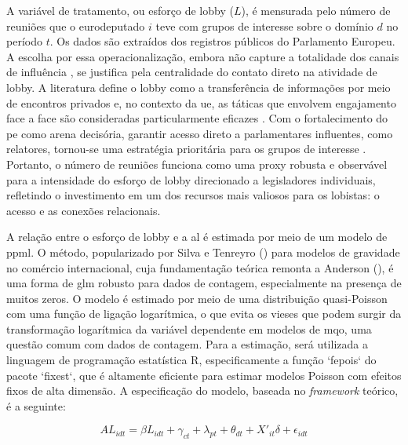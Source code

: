 A variável de tratamento, ou esforço de lobby ($L$), é mensurada pelo número de reuniões que o eurodeputado $i$ teve com grupos de interesse sobre o domínio $d$ no período $t$. Os dados são extraídos dos registros públicos do Parlamento Europeu. A escolha por essa operacionalização, embora não capture a totalidade dos canais de influência \cite{dur_measuring_2008}, se justifica pela centralidade do contato direto na atividade de lobby. A literatura define o lobby como a transferência de informações por meio de encontros privados \cite{de_figueiredo_advancing_2014} e, no contexto da \acrshort{ue}, as táticas que envolvem engajamento face a face são consideradas particularmente eficazes \cite{Huwyler2022}. Com o fortalecimento do \acrshort{pe} como arena decisória, garantir acesso direto a parlamentares influentes, como relatores, tornou-se uma estratégia prioritária para os grupos de interesse \cite{kluver2015legislative, marshall2010lobby}. Portanto, o número de reuniões funciona como uma proxy robusta e observável para a intensidade do esforço de lobby direcionado a legisladores individuais, refletindo o investimento em um dos recursos mais valiosos para os lobistas: o acesso e as conexões relacionais.

A relação entre o esforço de lobby e a \acrshort{al} é estimada por meio de um modelo de \acrfull{ppml}. O método, popularizado por Silva e Tenreyro (\citeyear{silva2006log}) para modelos de gravidade no comércio internacional, cuja fundamentação teórica remonta a Anderson (\citeyear{anderson1979theoretical}), é uma forma de \acrfull{glm} robusto para dados de contagem, especialmente na presença de muitos zeros. O modelo é estimado por meio de uma distribuição quasi-Poisson com uma função de ligação logarítmica, o que evita os vieses que podem surgir da transformação logarítmica da variável dependente em modelos de \acrfull{mqo}, uma questão comum com dados de contagem. Para a estimação, será utilizada a linguagem de programação estatística R, especificamente a função `fepois` do pacote `fixest`, que é altamente eficiente para estimar modelos Poisson com efeitos fixos de alta dimensão. A especificação do modelo, baseada no \textit{framework} teórico, é a seguinte:

\begin{equation}
    \label{eq:modelo_final}
    AL_{idt} = \beta L_{idt} + \gamma_{ct} + \lambda_{pt} + \theta_{dt} + X'_{it}\delta + \epsilon_{idt}
\end{equation}

